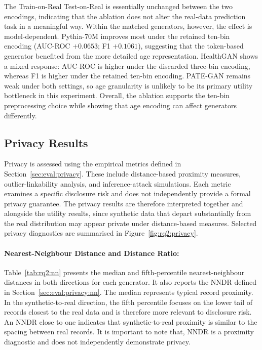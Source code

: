 The Train-on-Real Test-on-Real is essentially unchanged between the two
encodings, indicating that the ablation does not alter the real-data
prediction task in a meaningful way. Within the matched generators,
however, the effect is model-dependent. Pythia-70M improves most under
the retained ten-bin encoding (AUC-ROC $+0.0653$; F1 $+0.1061$),
suggesting that the token-based generator benefited from the more detailed
age representation. HealthGAN shows a mixed response: AUC-ROC is higher
under the discarded three-bin encoding, whereas F1 is higher under the
retained ten-bin encoding. PATE-GAN remains weak under both settings, so
age granularity is unlikely to be its primary utility bottleneck in this
experiment. Overall, the ablation supports the ten-bin preprocessing
choice while showing that age encoding can affect generators differently.


\subsection{Privacy Results}
\label{sec:results:rq2:privacy}

Privacy is assessed using the empirical metrics defined in
Section~\ref{sec:eval:privacy}. These include distance-based proximity
measures, outlier-linkability analysis, and inference-attack
simulations. Each metric examines a specific disclosure risk and does
not independently provide a formal privacy guarantee. The privacy
results are therefore interpreted together and alongside the utility
results, since synthetic data that depart substantially from the real
distribution may appear private under distance-based measures. Selected
privacy diagnostics are summarised in Figure~\ref{fig:rq2:privacy}.

\paragraph{Nearest-Neighbour Distance and Distance Ratio:}
Table~\ref{tab:rq2:nn} presents the median and fifth-percentile
nearest-neighbour distances in both directions for each generator. It
also reports the NNDR defined in
Section~\ref{sec:eval:privacy:nn}. The median represents typical record
proximity. In the synthetic-to-real direction, the fifth percentile
focuses on the lower tail of records closest to the real data and is
therefore more relevant to disclosure risk. An NNDR close to one
indicates that synthetic-to-real proximity is similar to the spacing
between real records. It is important to note that, NNDR is a proximity diagnostic and does
not independently demonstrate privacy.

